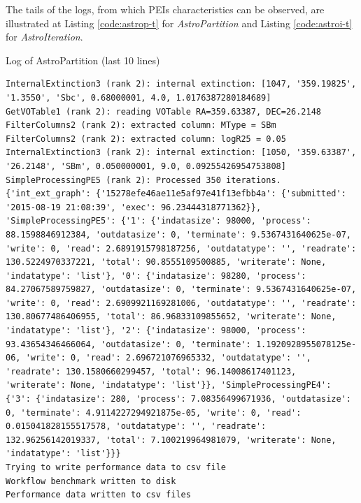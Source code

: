 \documentclass[10pt,twoside,openright,logo]{report}
\begin{document}
The tails of the logs, from which PEIs characteristics can be observed, are illustrated at Listing \ref{code:astrop-t} for \textit{AstroPartition} and Listing \ref{code:astroi-t} for \textit{AstroIteration}.

\begin{listing}
\caption{Log of AstroPartition (last 10 lines)}
\label{code:astrop-t}
\begin{verbatim}
InternalExtinction3 (rank 2): internal extinction: [1047, '359.19825', '1.3550', 'Sbc', 0.68000001, 4.0, 1.0176387280184689]
GetVOTable1 (rank 2): reading VOTable RA=359.63387, DEC=26.2148
FilterColumns2 (rank 2): extracted column: MType = SBm
FilterColumns2 (rank 2): extracted column: logR25 = 0.05
InternalExtinction3 (rank 2): internal extinction: [1050, '359.63387', '26.2148', 'SBm', 0.050000001, 9.0, 0.09255426954753808]
SimpleProcessingPE5 (rank 2): Processed 350 iterations.
{'int_ext_graph': {'15278efe46ae11e5af97e41f13efbb4a': {'submitted': '2015-08-19 21:08:39', 'exec': 96.23444318771362}}, 'SimpleProcessingPE5': {'1': {'indatasize': 98000, 'process': 88.1598846912384, 'outdatasize': 0, 'terminate': 9.5367431640625e-07, 'write': 0, 'read': 2.6891915798187256, 'outdatatype': '', 'readrate': 130.5224970337221, 'total': 90.8555109500885, 'writerate': None, 'indatatype': 'list'}, '0': {'indatasize': 98280, 'process': 84.27067589759827, 'outdatasize': 0, 'terminate': 9.5367431640625e-07, 'write': 0, 'read': 2.6909921169281006, 'outdatatype': '', 'readrate': 130.80677486406955, 'total': 86.96833109855652, 'writerate': None, 'indatatype': 'list'}, '2': {'indatasize': 98000, 'process': 93.43654346466064, 'outdatasize': 0, 'terminate': 1.1920928955078125e-06, 'write': 0, 'read': 2.696721076965332, 'outdatatype': '', 'readrate': 130.1580660299457, 'total': 96.14008617401123, 'writerate': None, 'indatatype': 'list'}}, 'SimpleProcessingPE4': {'3': {'indatasize': 280, 'process': 7.08356499671936, 'outdatasize': 0, 'terminate': 4.9114227294921875e-05, 'write': 0, 'read': 0.015041828155517578, 'outdatatype': '', 'readrate': 132.96256142019337, 'total': 7.100219964981079, 'writerate': None, 'indatatype': 'list'}}}
Trying to write performance data to csv file
Workflow benchmark written to disk
Performance data written to csv files
\end{verbatim}
\end{listing}
\end{document}
